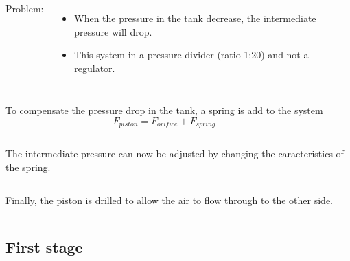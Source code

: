 \documentclass[aspectratio=1610,english,12pt]{beamer}
\begin{document}
\begin{frame}{\insertsubsection}
	\begin{columns}[onlytextwidth]
			Problem:
			\begin{itemize}
				\item When the pressure in the tank decrease, the intermediate pressure will drop.
				\item This system in a pressure divider (ratio 1:20) and not a regulator.
			\end{itemize}
	\end{columns}
\end{frame}

\begin{frame}{\insertsubsection}
	\begin{columns}[onlytextwidth]
			To compensate the pressure drop in the tank, a spring is add to the system\\
			$$F_{piston}=F_{orifice}+F_{spring}$$
	\end{columns}
\end{frame}

\begin{frame}{\insertsubsection}
	\begin{columns}[onlytextwidth]
			The intermediate pressure can now be adjusted by changing the caracteristics of the spring. 
	\end{columns}
\end{frame}

\begin{frame}{\insertsubsection}
	\begin{columns}[onlytextwidth]
			Finally, the piston is drilled to allow the air to flow through to the other side.
	\end{columns}
\end{frame}

\begin{frame}{\insertsubsection}
\end{frame}

\subsection{First stage}
\end{document}
